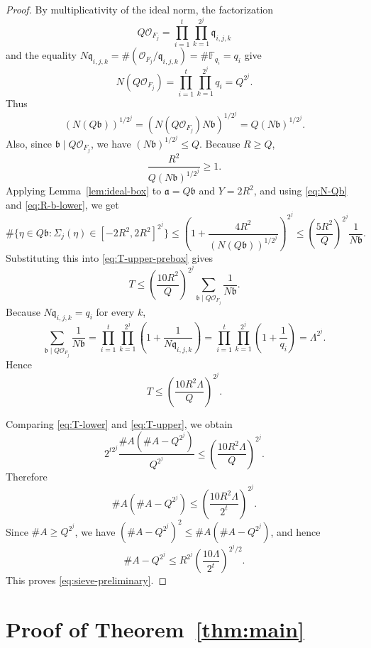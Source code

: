 \begin{proof}
By multiplicativity of the ideal norm, the factorization
\[
Q\mathcal O_{F_j}
=
\prod_{i=1}^t\prod_{k=1}^{2^j}\mathfrak q_{i,j,k}
\]
and the equality \(N\mathfrak q_{i,j,k}=\#(\mathcal O_{F_j}/\mathfrak q_{i,j,k})=\#\mathbb F_{q_i}=q_i\) give
\[
N(Q\mathcal O_{F_j})
=
\prod_{i=1}^t\prod_{k=1}^{2^j}q_i
=
Q^{2^j}.
\]
Thus
\begin{equation}\label{eq:N-Qb}
(N(Q\mathfrak b))^{1/2^j}
=
(N(Q\mathcal O_{F_j})N\mathfrak b)^{1/2^j}
=
Q(N\mathfrak b)^{1/2^j}.
\end{equation}
Also, since \(\mathfrak b\mid Q\mathcal O_{F_j}\), we have \((N\mathfrak b)^{1/2^j}\le Q\).
Because \(R\ge Q\),
\begin{equation}\label{eq:R-b-lower}
\frac{R^2}{Q(N\mathfrak b)^{1/2^j}}\ge1.
\end{equation}
Applying Lemma~\ref{lem:ideal-box} to \(\mathfrak a=Q\mathfrak b\) and \(Y=2R^2\), and using \eqref{eq:N-Qb} and \eqref{eq:R-b-lower}, we get
\[
\#\{\eta\in Q\mathfrak b:\Sigma_j(\eta)\in[-2R^2,2R^2]^{2^j}\}
\le
\left(1+\frac{4R^2}{(N(Q\mathfrak b))^{1/2^j}}\right)^{2^j}
\le
\left(\frac{5R^2}{Q}\right)^{2^j}\frac1{N\mathfrak b}.
\]
Substituting this into \eqref{eq:T-upper-prebox} gives
\[
T
\le
\left(\frac{10R^2}{Q}\right)^{2^j}
\sum_{\mathfrak b\mid Q\mathcal O_{F_j}}\frac1{N\mathfrak b}.
\]
Because \(N\mathfrak q_{i,j,k}=q_i\) for every \(k\),
\[
\sum_{\mathfrak b\mid Q\mathcal O_{F_j}}\frac1{N\mathfrak b}
=
\prod_{i=1}^t\prod_{k=1}^{2^j}
\left(1+\frac1{N\mathfrak q_{i,j,k}}\right)
=
\prod_{i=1}^t\prod_{k=1}^{2^j}
\left(1+\frac1{q_i}\right)
=
\Lambda^{2^j}.
\]
Hence
\begin{equation}\label{eq:T-upper}
T\le
\left(\frac{10R^2\Lambda}{Q}\right)^{2^j}.
\end{equation}

Comparing \eqref{eq:T-lower} and \eqref{eq:T-upper}, we obtain
\[
2^{t2^j}\frac{\#A(\#A-Q^{2^j})}{Q^{2^j}}
\le
\left(\frac{10R^2\Lambda}{Q}\right)^{2^j}.
\]
Therefore
\[
\#A(\#A-Q^{2^j})
\le
\left(\frac{10R^2\Lambda}{2^t}\right)^{2^j}.
\]
Since \(\#A\ge Q^{2^j}\), we have \((\#A-Q^{2^j})^2\le \#A(\#A-Q^{2^j})\), and hence
\[
\#A-Q^{2^j}
\le
R^{2^j}\left(\frac{10\Lambda}{2^t}\right)^{2^j/2}.
\]
This proves \eqref{eq:sieve-preliminary}.
\end{proof}

\section{Proof of Theorem~\ref{thm:main}}
\label{sec:proof-main-theorem}

